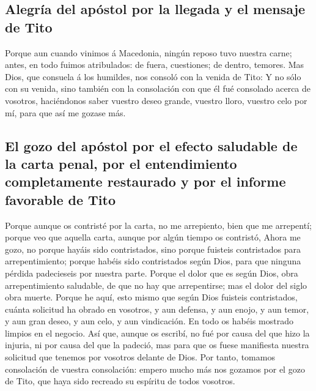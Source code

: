 \hypertarget{alegruxeda-del-apuxf3stol-por-la-llegada-y-el-mensaje-de-tito}{%
\subsection{Alegría del apóstol por la llegada y el mensaje de
Tito}\label{alegruxeda-del-apuxf3stol-por-la-llegada-y-el-mensaje-de-tito}}

 Porque aun cuando vinimos á Macedonia, ningún reposo tuvo
nuestra carne; antes, en todo fuimos atribulados: de fuera, cuestiones;
de dentro, temores.  Mas Dios, que consuela á los
humildes, nos consoló con la venida de Tito:  Y no sólo
con su venida, sino también con la consolación con que él fué consolado
acerca de vosotros, haciéndonos saber vuestro deseo grande, vuestro
lloro, vuestro celo por mí, para que así me gozase más.

\hypertarget{el-gozo-del-apuxf3stol-por-el-efecto-saludable-de-la-carta-penal-por-el-entendimiento-completamente-restaurado-y-por-el-informe-favorable-de-tito}{%
\subsection{El gozo del apóstol por el efecto saludable de la carta
penal, por el entendimiento completamente restaurado y por el informe
favorable de
Tito}\label{el-gozo-del-apuxf3stol-por-el-efecto-saludable-de-la-carta-penal-por-el-entendimiento-completamente-restaurado-y-por-el-informe-favorable-de-tito}}

 Porque aunque os contristé por la carta, no me
arrepiento, bien que me arrepentí; porque veo que aquella carta, aunque
por algún tiempo os contristó,  Ahora me gozo, no porque
hayáis sido contristados, sino porque fuisteis contristados para
arrepentimiento; porque habéis sido contristados según Dios, para que
ninguna pérdida padecieseis por nuestra parte.  Porque el
dolor que es según Dios, obra arrepentimiento saludable, de que no hay
que arrepentirse; mas el dolor del siglo obra muerte. 
Porque he aquí, esto mismo que según Dios fuisteis contristados, cuánta
solicitud ha obrado en vosotros, y aun defensa, y aun enojo, y aun
temor, y aun gran deseo, y aun celo, y aun vindicación. En todo os
habéis mostrado limpios en el negocio.  Así que, aunque
os escribí, no fué por causa del que hizo la injuria, ni por causa del
que la padeció, mas para que os fuese manifiesta nuestra solicitud que
tenemos por vosotros delante de Dios.  Por tanto, tomamos
consolación de vuestra consolación: empero mucho más nos gozamos por el
gozo de Tito, que haya sido recreado su espíritu de todos vosotros.

